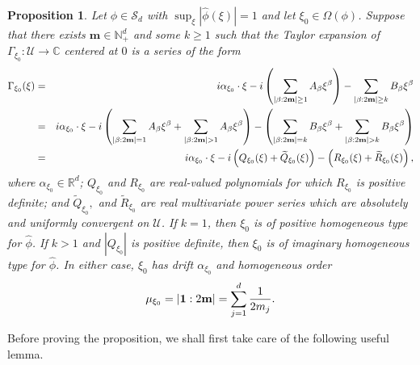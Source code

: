 \documentclass[11pt, letter]{book}
\newtheorem{proposition}[theorem]{Proposition}
\newcommand{\lp}{\left(}
\newcommand{\rp}{\right)}
\newcommand{\al}{\alpha}
\newcommand{\be}{\beta}
\begin{document}
\begin{framed}
\begin{proposition}\label{prop:ExpandGamma}
Let $\phi\in\mathcal{S}_d$ with $\sup_{\xi}|\widehat{\phi}(\xi)|=1$ and let $\xi_0\in\Omega(\phi)$. Suppose that there exists $\mathbf{m}\in \mathbb{N}^d_+$ and some $k \geq 1$ such that the Taylor expansion of $\Gamma_{\xi_0} : \mathcal{U}\to\mathbb{C}$ centered at $0$ is a series of the form
\begin{eqnarray}\label{eq:SemiEllipticImaginaryExpansion}\nonumber
    \Gamma_{\xi_0}(\xi) 
    &=& i\al_{\xi_0} \cdot \xi - i \left( \sum_{\abs{\be : 2\mathbf{m}} \geq 1} A_\be \xi^\be\right) - \sum_{\abs{\be : 2\mathbf{m}} \geq k} B_\be \xi^\be \\ \nonumber
    &=& i\al_{\xi_0} \cdot \xi - i \lp \sum_{\abs{\be : 2\mathbf{m}} = 1} A_\be \xi^\be + \sum_{\abs{\be : 2\mathbf{m}} > 1} A_\be \xi^\be\rp 
    - \lp \sum_{\abs{\be : 2\mathbf{m}} = k} B_\be \xi^\be + \sum_{\abs{\be : 2\mathbf{m}} > k} B_\be \xi^\be \rp \\
    &=&  i\al_{\xi_0} \cdot \xi - i\lp Q_{\xi_0}(\xi) + \widetilde{Q}_{\xi_0}(\xi)\rp - \lp R_{\xi_0}(\xi) + \widetilde{R}_{\xi_0}(\xi) \rp,
\end{eqnarray}
where $\al_{\xi_0} \in \mathbb{R}^d$;   $Q_{\xi_0}$ and $R_{\xi_0}$ are real-valued polynomials for which $R_{\xi_0}$ is positive definite; and  $\widetilde{Q}_{\xi_0},$ and $\widetilde{R}_{\xi_0}$ are real multivariate power series which are absolutely and uniformly convergent on $\mathcal{U}$. If $k=1$, then $\xi_0$ is of positive homogeneous type for $\widehat{\phi}$. If $k>1$ and $|Q_{\xi_0}|$ is positive definite, then $\xi_0$ is of imaginary homogeneous type for $\hat{\phi}$. In either case, $\xi_0$ has drift $\alpha_{\xi_0}$ and homogeneous order
\begin{equation*}
    \mu_{\xi_0}=\abs{\mathbf{1}:2\mathbf{m}}=\sum_{j=1}^d\frac{1}{2m_j}.
\end{equation*}
\end{proposition}
\end{framed}

\noindent Before proving the proposition, we shall first take care of the following useful lemma.
\end{document}
